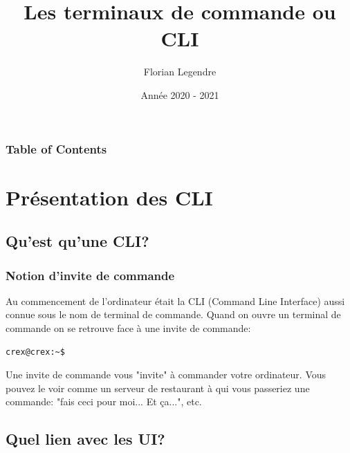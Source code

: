 \documentclass{beamer}
\title[CLI]{Les terminaux de commande ou CLI}
\author{Florian Legendre}
\institute{Université de Poitiers}
\date{Année 2020 - 2021}
\begin{document}
\frame{\titlepage}

\begin{frame}
\frametitle{Table of Contents}
\tableofcontents[hideallsubsections]
\end{frame}


\section{Présentation des CLI}

\subsection{Qu'est qu'une CLI?}

\begin{frame}[fragile]
\frametitle{Notion d'invite de commande}
Au commencement de l'ordinateur était la CLI (Command Line Interface) aussi connue sous le nom de terminal de commande. Quand on ouvre un terminal de commande on se retrouve face à une invite de commande:

\begin{mdframed}[style=Bash]
\begin{lstlisting}[style=Bash, caption={Une "invite" de commande}]
crex@crex:~$ 
\end{lstlisting}
\end{mdframed}

Une invite de commande vous "invite" à commander votre ordinateur. Vous pouvez le voir comme un serveur de restaurant à qui vous passeriez une commande: "fais ceci pour moi... Et ça...", etc.

\end{frame}

\subsection{Quel lien avec les UI?}
\end{document}
